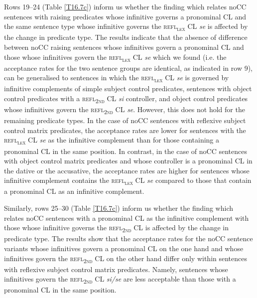 Rows 19--24 (Table \ref{T16.7c}) inform us whether the finding which relates noCC sentences with raising predicates whose infinitive governs a pronominal CL and the same sentence type whose infinitive governs the \textsc{refl\textsubscript{\textsc{lex}}} CL \textit{se} is affected by the change in predicate type. The results indicate that the absence of difference between noCC raising sentences whose infinitives govern a pronominal CL and those whose infinitives govern the \textsc{refl\textsubscript{\textsc{lex}}} CL \textit{se} which we found (i.e. the acceptance rates for the two sentence groups are identical, as indicated in row 9), can be generalised to sentences in which the \textsc{refl\textsubscript{\textsc{lex}}} CL \textit{se} is governed by infinitive complements of simple subject control predicates, sentences with object control predicates with a \textsc{refl\textsubscript{2nd}} CL \textit{si} controller, and object control predicates whose infinitives govern the \textsc{refl\textsubscript{2nd}} CL \textit{se}. However, this does not hold for the remaining predicate types. In the case of noCC sentences with reflexive subject control matrix predicates, the acceptance rates are lower for sentences with the \textsc{refl\textsubscript{\textsc{lex}}} CL \textit{se} as the infinitive complement than for those containing a pronominal CL in the same position. In contrast, in the case of noCC sentences with object control matrix predicates and whose controller is a pronominal CL in the dative or the accusative, the acceptance rates are higher for sentences whose infinitive complement contains the \textsc{refl\textsubscript{\textsc{lex}}} CL \textit{se} compared to those that contain a pronominal CL as an infinitive complement. 

Similarly, rows 25--30 (Table \ref{T16.7c}) inform us whether the finding which relates noCC sentences with a pronominal CL as the infinitive complement with those whose infinitive governs the \textsc{refl\textsubscript{2nd}} CL is affected by the change in predicate type. The results show that the acceptance rates for the noCC sentence variants whose infinitives govern a pronominal CL on the one hand and whose infinitives govern the \textsc{refl\textsubscript{2nd}} CL on the other hand differ only within sentences with reflexive subject control matrix predicates. Namely, sentences whose infinitives govern the \textsc{refl\textsubscript{2nd}} CL \textit{si/se} are less acceptable than those with a pronominal CL in the same position. 

